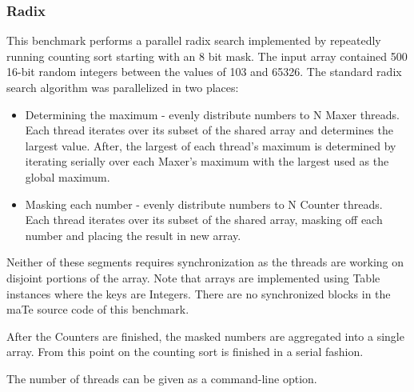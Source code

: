 \subsubsection{Radix}

This benchmark performs a parallel radix search implemented by
repeatedly running counting sort starting with an 8 bit mask.  The
input array contained 500 16-bit random integers between the values of
103 and 65326.  The standard radix search algorithm was parallelized
in two places:

\begin{itemize}
\item Determining the maximum - evenly distribute numbers to N Maxer
  threads.  Each thread iterates over its subset of the shared array
  and determines the largest value.  After, the largest of each
  thread's maximum is determined by iterating serially over each
  Maxer's maximum with the largest used as the global maximum.

\item Masking each number - evenly distribute numbers to N Counter
  threads.  Each thread iterates over its subset of the shared array,
  masking off each number and placing the result in new array.
\end{itemize}

Neither of these segments requires synchronization as the threads are
working on disjoint portions of the array.  Note that arrays are
implemented using Table instances where the keys are Integers.  There
are no synchronized blocks in the maTe source code of this benchmark.

After the Counters are finished, the masked numbers are aggregated
into a single array.  From this point on the counting sort is finished
in a serial fashion.

The number of threads can be given as a command-line option.

\pagebreak

